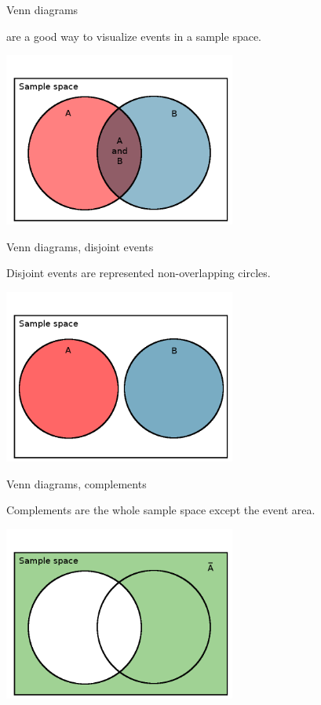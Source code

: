 \documentclass[xcolor=table, aspectratio=169, bigger, handout]{beamer}
\begin{document}
\begin{frame}{Venn diagrams}
\begin{block}{}
\large {} are a good way to visualize events in a sample space.
\end{block}
{\centering
\includegraphics[width=3in]{../images/ch4_venn_ovr}\par
}
\end{frame}

\begin{frame}{Venn diagrams, disjoint events}
\begin{block}{}
\large Disjoint events are represented non-overlapping circles.
\end{block}
{\centering
\includegraphics[width=3in]{../images/ch4_venn_dsj}\par
}
\end{frame}

\begin{frame}{Venn diagrams, complements}
\begin{block}{}
\large Complements are the whole sample space except the event area.
\end{block}
{\centering
\includegraphics[width=3in]{../images/ch4_venn_a_comp}\par
}
\end{frame}
\end{document}
